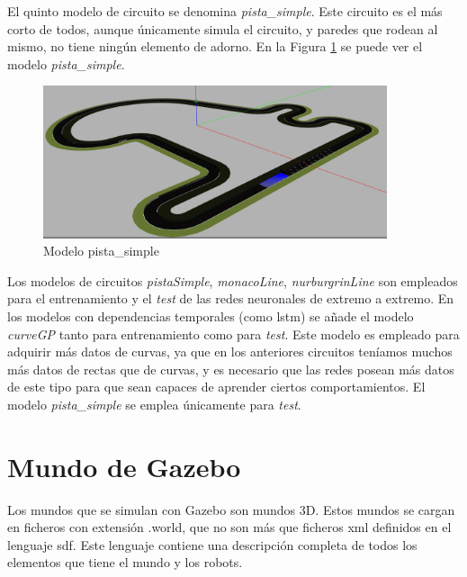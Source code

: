 El quinto modelo de circuito se denomina \textit{ pista\_simple}. Este circuito es el más corto de todos, aunque únicamente simula el circuito, y paredes que rodean al mismo, no tiene ningún elemento de adorno. En la Figura \ref{fig.small} se puede ver el modelo \textit{pista\_simple}.\\

\begin{figure}
  \begin{center}
    \includegraphics[width=0.9\textwidth]{figures/Infraestructura/circuit_Small.png}
		\caption{Modelo pista\_simple}
		\label{fig.small}
		\end{center}
\end{figure}


Los modelos de circuitos \textit{pistaSimple}, \textit{monacoLine}, \textit{nurburgrinLine} son empleados para el entrenamiento y el \textit{test} de las redes neuronales de extremo a extremo. En los modelos con dependencias temporales (como \acrshort{lstm}) se añade el modelo \textit{curveGP} tanto para entrenamiento como para \textit{test}. Este modelo es empleado para adquirir más datos de curvas, ya que en los anteriores circuitos teníamos muchos más datos de rectas que de curvas, y es necesario que las redes posean más datos de este tipo para que sean capaces de aprender ciertos comportamientos. El modelo \textit{pista\_simple} se emplea únicamente para \textit{test}.\\



\section{Mundo de Gazebo}\label{mundo}

Los mundos que se simulan con Gazebo son mundos 3D. Estos mundos se cargan en ficheros con extensión .world, que no son más que ficheros \acrshort{xml} definidos en el lenguaje \acrshort{sdf}. Este lenguaje contiene una descripción completa de todos los elementos que tiene el mundo y los robots.\\

